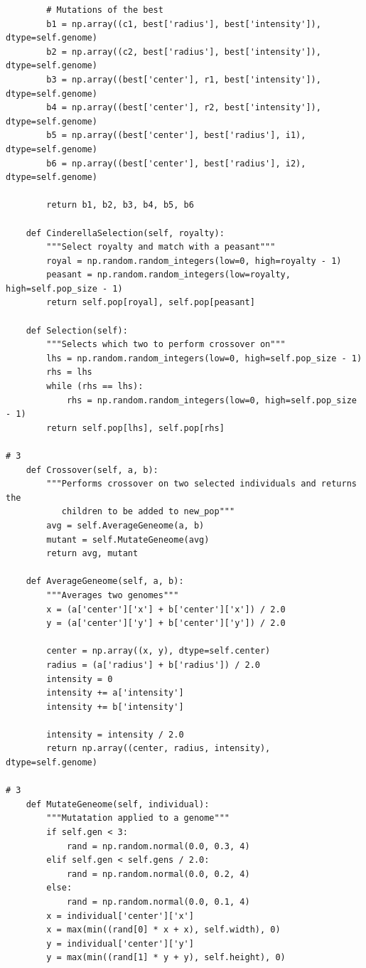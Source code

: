\documentclass[12pt]{article}
\begin{document}
\begin{verbatim}
        # Mutations of the best
        b1 = np.array((c1, best['radius'], best['intensity']), dtype=self.genome)
        b2 = np.array((c2, best['radius'], best['intensity']), dtype=self.genome)
        b3 = np.array((best['center'], r1, best['intensity']), dtype=self.genome)
        b4 = np.array((best['center'], r2, best['intensity']), dtype=self.genome)
        b5 = np.array((best['center'], best['radius'], i1), dtype=self.genome)
        b6 = np.array((best['center'], best['radius'], i2), dtype=self.genome)

        return b1, b2, b3, b4, b5, b6

    def CinderellaSelection(self, royalty):
        """Select royalty and match with a peasant"""
        royal = np.random.random_integers(low=0, high=royalty - 1)
        peasant = np.random.random_integers(low=royalty, high=self.pop_size - 1)
        return self.pop[royal], self.pop[peasant]

    def Selection(self):
        """Selects which two to perform crossover on"""
        lhs = np.random.random_integers(low=0, high=self.pop_size - 1)
        rhs = lhs
        while (rhs == lhs):
            rhs = np.random.random_integers(low=0, high=self.pop_size - 1)
        return self.pop[lhs], self.pop[rhs]

# 3
    def Crossover(self, a, b):
        """Performs crossover on two selected individuals and returns the 
           children to be added to new_pop"""
        avg = self.AverageGeneome(a, b)
        mutant = self.MutateGeneome(avg)
        return avg, mutant

    def AverageGeneome(self, a, b):
        """Averages two genomes"""
        x = (a['center']['x'] + b['center']['x']) / 2.0
        y = (a['center']['y'] + b['center']['y']) / 2.0

        center = np.array((x, y), dtype=self.center)
        radius = (a['radius'] + b['radius']) / 2.0
        intensity = 0
        intensity += a['intensity']
        intensity += b['intensity']

        intensity = intensity / 2.0
        return np.array((center, radius, intensity), dtype=self.genome)

# 3
    def MutateGeneome(self, individual):
        """Mutatation applied to a genome"""
        if self.gen < 3:
            rand = np.random.normal(0.0, 0.3, 4)
        elif self.gen < self.gens / 2.0:
            rand = np.random.normal(0.0, 0.2, 4)
        else:
            rand = np.random.normal(0.0, 0.1, 4)
        x = individual['center']['x']
        x = max(min((rand[0] * x + x), self.width), 0)
        y = individual['center']['y']
        y = max(min((rand[1] * y + y), self.height), 0)
        

\end{verbatim}
\end{document}
